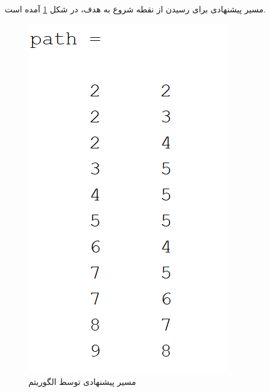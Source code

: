 مسیر پیشنهادی برای رسیدن از نقطه شروع به هدف، در شکل \ref{Fig:example path} آمده است.
\begin{figure}[!h]
	\centering
	\includegraphics[scale=0.4]{Images/example-path.png}
	\caption{مسیر پیشنهادی توسط الگوریتم }\label{Fig:example path}
\end{figure}

